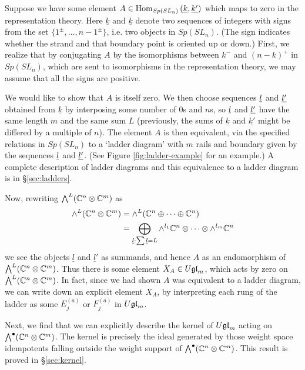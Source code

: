 \documentclass[11pt,leqno]{article}
\begin{document}
Suppose we have some element $A \in \operatorname{Hom}_{Sp(SL_n)}\left(\underline{k},\underline{k'}\right)$ which maps to zero in the representation theory. Here $\underline{k}$ and $\underline{k}$ denote two sequences of integers with signs from the set $\{1^\pm,\ldots,n-1^\pm\}$, i.e. two objects in $Sp(SL_n)$. (The sign indicates whether the strand and that boundary point is oriented up or down.) First, we realize that by conjugating $A$ by the isomorphisms between $k^-$ and $(n-k)^+$ in $Sp(SL_n)$, which are sent to isomorphisms in the representation theory, we may assume that all the signs are positive.

 We would like to show that $A$ is itself zero. 
 We then choose sequences ${\underline{l}}$ and ${\underline{l'}}$ obtained from $\underline{k}$ by interposing some number of $0$s and $n$s, so ${\underline{l}}$ and ${\underline{l'}}$ have the same length $m$ and the same sum $L$ (previously, the sums of $\underline{k}$ and $\underline{k'}$ might be differed by a multiple of $n$).
 The element $A$ is then equivalent, via the specified relations in $Sp(SL_n)$ to a `ladder diagram' with $m$ rails and boundary given by the sequences ${\underline{l}}$ and ${\underline{l'}}$. (See Figure \ref{fig:ladder-example} for an example.)
A complete description of ladder diagrams and this equivalence to a ladder diagram is in \S \ref{sec:ladders}.

Now, rewriting $\bigwedge^L(\mathbb C^n \otimes \mathbb C^m)$ as
\begin{align*}
\wedge^L(\mathbb C^n \otimes \mathbb C^m) & = \wedge^L(\mathbb C^n \oplus \cdots \oplus \mathbb C^n) \\
        & = \bigoplus_{\underline{l}: \sum \underline{l} = L} \wedge^{l_1} \mathbb C^n \otimes \cdots \otimes \wedge^{l_m} \mathbb C^n
\end{align*}
we see the objects $\underline{l}$ and $\underline{l}'$ as summands, and hence $A$ as an endomorphism of $\bigwedge^L(\mathbb C^n \otimes \mathbb C^m)$. Thus there is some element $X_{A} \in U\mathfrak{gl}_{m}$, which acts by zero on $\bigwedge^L(\mathbb C^n \otimes \mathbb C^m)$. In fact, since we had shown $A$ was equivalent to a ladder diagram, we can write down an explicit element $X_A$, by interpreting each rung of the ladder as some $E^{(a)}_j$ or $F^{(a)}_j$ in $U\mathfrak{gl}_{m}$. 

Next, we find that we can explicitly describe the kernel of $U\mathfrak{gl}_{m}$ acting on $\bigwedge^\bullet(\mathbb C^n \otimes \mathbb C^m)$. The kernel is precisely the ideal generated by those weight space idempotents falling outside the weight support of $\bigwedge^\bullet(\mathbb C^n \otimes \mathbb C^m)$.  This result is proved in \S \ref{sec:kernel}.
\end{document}
